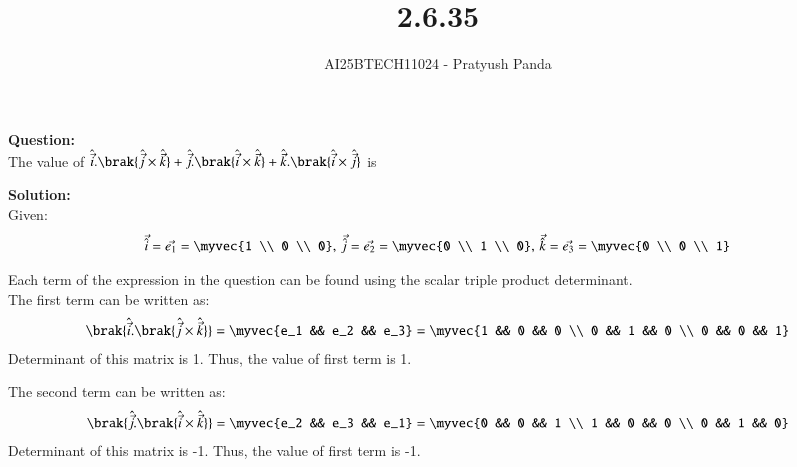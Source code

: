 \documentclass[journal]{IEEEtran}
\begin{document}

\vspace{3cm}

\title{2.6.35}
\author{AI25BTECH11024 - Pratyush Panda
}
\maketitle
{\let\newpage\relax\maketitle}

\renewcommand{\thefigure}{\theenumi}
\renewcommand{\thetable}{\theenumi}
\setlength{\intextsep}{10pt} %


\renewcommand{\thetable}{\theenumi}

\textbf{Question: } \\
The value of $\hat{\Vec{i}}.\brak{\hat{\Vec{j}} \times \hat{\Vec{k}}} + \hat{\Vec{j}}.\brak{\hat{\Vec{i}} \times \hat{\Vec{k}}} + \hat{\Vec{k}}.\brak{\hat{\Vec{i}} \times \hat{\Vec{j}}}$ is \underline{\hspace{2cm}}
\vspace{0.5cm}

\textbf{Solution: } \\
Given:
\begin{align}
\Vec{\hat{i}}=\Vec{e_1}=\myvec{1 \\ 0 \\ 0}, \, \Vec{\hat{j}}=\Vec{e_2}=\myvec{0 \\ 1 \\ 0}, \, \Vec{\hat{k}}=\Vec{e_3}=\myvec{0 \\ 0 \\ 1}
\end{align}

Each term of the expression in the question can be found using the scalar triple product determinant.\\
The first term can be written as:
\begin{align}
\brak{\hat{\Vec{i}}.\brak{\hat{\Vec{j}} \times \hat{\Vec{k}}}} = 
\myvec{e_1 && e_2 && e_3} =
\myvec{1 && 0 && 0 \\
       0 && 1 && 0 \\
       0 && 0 && 1}
\end{align}
Determinant of this matrix is 1. Thus, the value of first term is 1.

The second term can be written as:
\begin{align}
\brak{\hat{\Vec{j}}.\brak{\hat{\Vec{i}} \times \hat{\Vec{k}}}} = 
\myvec{e_2 && e_3 && e_1} =
\myvec{0 && 0 && 1 \\
       1 && 0 && 0 \\
       0 && 1 && 0}
\end{align}
Determinant of this matrix is -1. Thus, the value of first term is -1.
\end{document}
